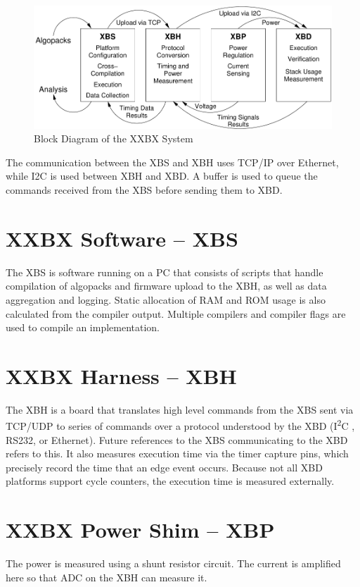 \documentclass[twoside,11pt]{cergdoc}
\newcommand{\ITwoC}{I\textsuperscript{2}C }
\begin{document}
\begin{figure}[ht]
  \begin{center}
    \includegraphics[scale=0.8]{figures/xxbx_block}
    \caption{Block Diagram of the XXBX System}\label{fig:xxbxsystem}
  \end{center}
\end{figure}



The communication between the XBS and XBH uses
TCP/IP over Ethernet, while I2C is used between
XBH and XBD. A buffer is used to queue the
commands received from the XBS before sending
them to XBD.

  \section{XXBX Software -- XBS}
The XBS is software running on a PC that consists of scripts that handle
compilation of algopacks and firmware upload to the
XBH, as well as data aggregation and logging. Static allocation of RAM and ROM
usage is also calculated from the compiler output. Multiple compilers and
compiler flags are used to compile an implementation.

  \section{XXBX Harness -- XBH}
The XBH is a board that translates high level commands from the XBS sent via
TCP/UDP to series of commands over a protocol understood by the XBD
(\ITwoC, RS232, or Ethernet). Future references to the XBS communicating to the
XBD refers to this.
It also measures execution time via the timer capture pins, which precisely
record the time that an edge event occurs. Because not all XBD
platforms support cycle counters, the execution time is measured externally.

  \section{XXBX Power Shim -- XBP}
 The power is measured
using a shunt resistor circuit. The current is amplified
here so that ADC on the XBH can measure it.
\end{document}
